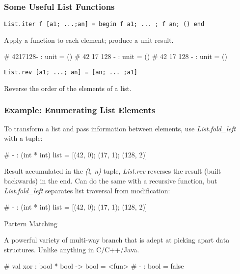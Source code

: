 \documentclass{plt}
\begin{document}
\begin{frame}[fragile]
  \frametitle{Some Useful List Functions}


\verb|List.iter f [a1; ...;an] = begin f a1; ... ; f an; () end|

Apply a function to each element; produce a unit result.


\begin{interactive}
# 
4217128- : unit = ()
# 
42
17
128
- : unit = ()
# 
42
17
128
- : unit = ()
\end{interactive}
\verb|List.rev [a1; ...; an] = [an; ... ;a1]|

Reverse the order of the elements of a list.

\end{frame}

\begin{frame}[fragile]
  \frametitle{Example: Enumerating List Elements}

To transform a list and pass information between elements, use
\emph{List.fold\_left} with a tuple:

\begin{interactive}
# 
- : (int * int) list = [(42, 0); (17, 1); (128, 2)]
\end{interactive}
Result accumulated in the \emph{(l, n)} tuple, \emph{List.rev}
reverses the result (built backwards) in the end.  Can do the same
with a recursive function, but \emph{List.fold\_left} separates list
traversal from modification:

\begin{interactive}
# 
- : (int * int) list = [(42, 0); (17, 1); (128, 2)]
\end{interactive}

\end{frame}

\begin{frame}[fragile]{Pattern Matching}

A powerful variety of multi-way branch that is adept at picking apart
data structures.  Unlike anything in C/C++/Java.

\begin{interactive}
# 
val xor : bool * bool -> bool = <fun>
# 
- : bool = false
\end{interactive}
\end{frame}
\end{document}
